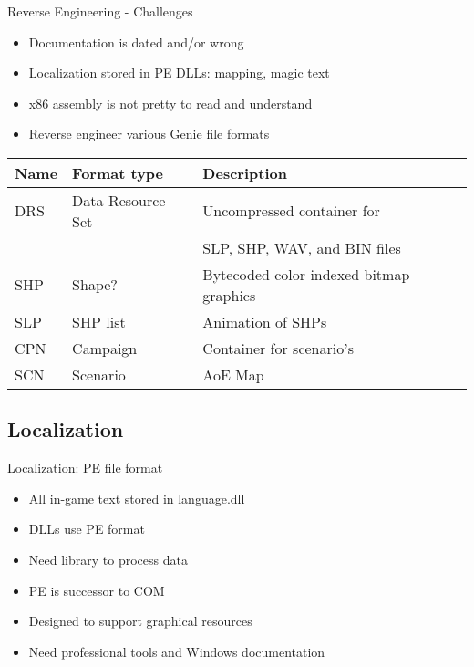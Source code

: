 \documentclass{beamer}
\begin{document}
\begin{frame}{Reverse Engineering - Challenges}
	\begin{itemize}
		\item Documentation is dated and/or wrong
		\item Localization stored in PE DLLs: mapping, magic text
		\item x86 assembly is not pretty to read and understand
		\item Reverse engineer various Genie file formats
	\end{itemize}

	\begin{tabular}{l|l|l}
	Name & Format type & Description \\ \hline
	DRS & Data Resource Set & Uncompressed container for \\
	& & SLP, SHP, WAV, and BIN files \\
	SHP & Shape? & Bytecoded color indexed bitmap graphics \\
	SLP & SHP list & Animation of SHPs \\
	CPN & Campaign & Container for scenario's \\
	SCN & Scenario & AoE Map
	\end{tabular}

\end{frame}


\subsection{Localization}

\begin{frame}{Localization: PE file format}
	\begin{itemize}
		\item All in-game text stored in language.dll
		\item DLLs use PE format
		\item Need library to process data
		\item PE is successor to COM
		\item Designed to support graphical resources
		\item Need professional tools and Windows documentation
	\end{itemize}
\end{frame}

\end{document}

